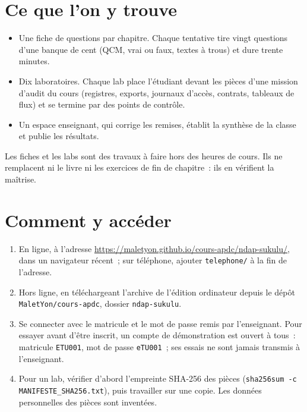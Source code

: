 \section*{Ce que l'on y trouve}

\begin{itemize}
    \item Une fiche de questions par chapitre. Chaque tentative tire vingt
          questions d'une banque de cent (QCM, vrai ou faux, textes à
          trous) et dure trente minutes.
    \item Dix laboratoires. Chaque lab place l'étudiant devant les pièces
          d'une mission d'audit du cours (registres, exports, journaux
          d'accès, contrats, tableaux de flux) et se termine par des points
          de contrôle.
    \item Un espace enseignant, qui corrige les remises, établit la
          synthèse de la classe et publie les résultats.
\end{itemize}

Les fiches et les labs sont des travaux à faire hors des heures de cours.
Ils ne remplacent ni le livre ni les exercices de fin de chapitre~: ils en
vérifient la maîtrise.

\section*{Comment y accéder}

\begin{enumerate}
    \item En ligne, à l'adresse
          \url{https://maletyon.github.io/cours-apdc/ndap-sukulu/}, dans un
          navigateur récent~; sur téléphone, ajouter \texttt{telephone/} à
          la fin de l'adresse.
    \item Hors ligne, en téléchargeant l'archive de l'édition ordinateur
          depuis le dépôt \texttt{MaletYon/cours-apdc}, dossier
          \texttt{ndap-sukulu}.
    \item Se connecter avec le matricule et le mot de passe remis par
          l'enseignant. Pour essayer avant d'être inscrit, un compte de
          démonstration est ouvert à tous~: matricule \texttt{ETU001}, mot
          de passe \texttt{eTU001}~; ses essais ne sont jamais transmis à
          l'enseignant.
    \item Pour un lab, vérifier d'abord l'empreinte SHA-256 des pièces
          (\texttt{sha256sum -c MANIFESTE\_SHA256.txt}), puis travailler sur
          une copie. Les données personnelles des pièces sont inventées.
\end{enumerate}

